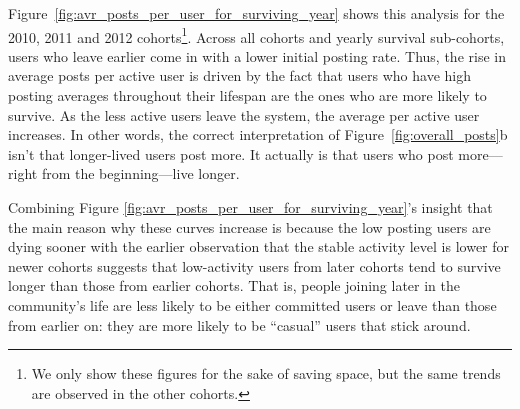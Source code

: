 Figure~\ref{fig:avr_posts_per_user_for_surviving_year} shows this analysis for the 2010, 2011 and 2012 cohorts\footnote{We only show these figures for the sake of saving space, but the same trends are observed in the other cohorts.}.  Across all cohorts and yearly survival sub-cohorts, users who leave earlier come in with a lower initial posting rate.  Thus, the rise in average posts per active user is driven by the fact that users who have high posting averages throughout their lifespan are the ones who are more likely to survive.  As the less active users leave the system, the average per active user increases.  In other words, the correct interpretation of Figure~\ref{fig:overall_posts}b isn't that longer-lived users post more.  It actually is that users who post more---right from the beginning---live longer. 

\begin{figure*}[!tb]
\centering
\caption{Each Figure corresponds to one cohort, from 2010 to 2012, left to right. The users for each cohort are further divided in groups based on how long they survived: users that survived up to 1 year are labeled 0, from 1 to 2 years are labeled 1, and so on.  For all cohorts, longer-tenured users started at higher activity levels than shorter-tenured ones.}
\label{fig:avr_posts_per_user_for_surviving_year}
\end{figure*}

Combining Figure \ref{fig:avr_posts_per_user_for_surviving_year}'s insight that the main reason why these curves increase is because the low posting users are dying sooner with the earlier observation that the stable activity level is lower for newer cohorts suggests that low-activity users from later cohorts tend to survive longer than those from earlier cohorts.  That is, people joining later in the community's life are less likely to be either committed users or leave than those from earlier on: they are more likely to be ``casual'' users that stick around.

